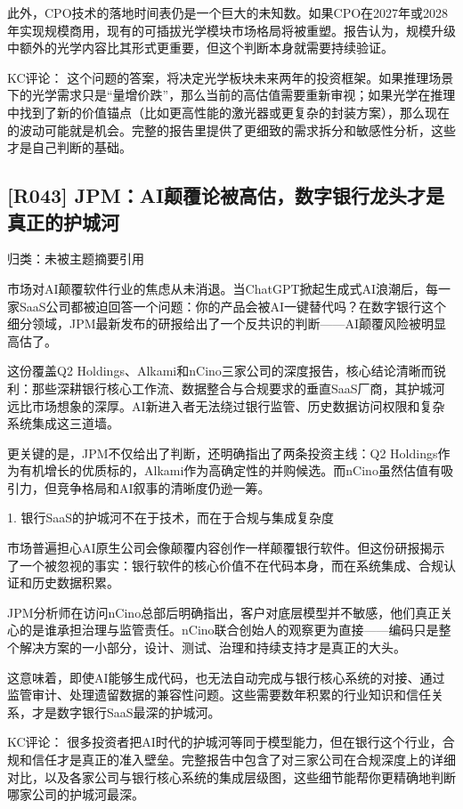 \documentclass[11pt]{ctexart}
\begin{document}
此外，CPO技术的落地时间表仍是一个巨大的未知数。如果CPO在2027年或2028年实现规模商用，现有的可插拔光学模块市场格局将被重塑。报告认为，规模升级中额外的光学内容比其形式更重要，但这个判断本身就需要持续验证。

KC评论： 这个问题的答案，将决定光学板块未来两年的投资框架。如果推理场景下的光学需求只是“量增价跌”，那么当前的高估值需要重新审视；如果光学在推理中找到了新的价值锚点（比如更高性能的激光器或更复杂的封装方案），那么现在的波动可能就是机会。完整的报告里提供了更细致的需求拆分和敏感性分析，这些才是自己判断的基础。

\subsection{[R043] JPM：AI颠覆论被高估，数字银行龙头才是真正的护城河}
{\small\color{refgray}归类：未被主题摘要引用}

市场对AI颠覆软件行业的焦虑从未消退。当ChatGPT掀起生成式AI浪潮后，每一家SaaS公司都被迫回答一个问题：你的产品会被AI一键替代吗？在数字银行这个细分领域，JPM最新发布的研报给出了一个反共识的判断——AI颠覆风险被明显高估了。

这份覆盖Q2 Holdings、Alkami和nCino三家公司的深度报告，核心结论清晰而锐利：那些深耕银行核心工作流、数据整合与合规要求的垂直SaaS厂商，其护城河远比市场想象的深厚。AI新进入者无法绕过银行监管、历史数据访问权限和复杂系统集成这三道墙。

更关键的是，JPM不仅给出了判断，还明确指出了两条投资主线：Q2 Holdings作为有机增长的优质标的，Alkami作为高确定性的并购候选。而nCino虽然估值有吸引力，但竞争格局和AI叙事的清晰度仍逊一筹。

1. 银行SaaS的护城河不在于技术，而在于合规与集成复杂度

市场普遍担心AI原生公司会像颠覆内容创作一样颠覆银行软件。但这份研报揭示了一个被忽视的事实：银行软件的核心价值不在代码本身，而在系统集成、合规认证和历史数据积累。

JPM分析师在访问nCino总部后明确指出，客户对底层模型并不敏感，他们真正关心的是谁承担治理与监管责任。nCino联合创始人的观察更为直接——编码只是整个解决方案的一小部分，设计、测试、治理和持续支持才是真正的大头。

这意味着，即使AI能够生成代码，也无法自动完成与银行核心系统的对接、通过监管审计、处理遗留数据的兼容性问题。这些需要数年积累的行业知识和信任关系，才是数字银行SaaS最深的护城河。

KC评论： 很多投资者把AI时代的护城河等同于模型能力，但在银行这个行业，合规和信任才是真正的准入壁垒。完整报告中包含了对三家公司在合规深度上的详细对比，以及各家公司与银行核心系统的集成层级图，这些细节能帮你更精确地判断哪家公司的护城河最深。
\end{document}
